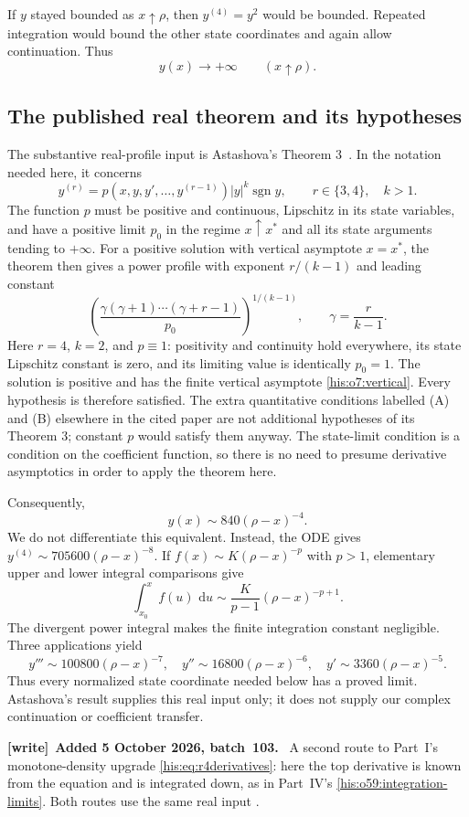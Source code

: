 \documentclass[11pt]{article}
\theoremstyle{remark}\newtheorem{remark}[theorem]{Remark}
\newcommand{\dd}{\,\mathrm d}
\numberwithin{equation}{section}
\newenvironment{writenote}[1][]{\par\smallskip\begingroup\small
 \noindent\textbf{[write]}\if\relax\detokenize{#1}\relax\else~\textbf{#1.}\fi\ }%
 {\par\endgroup\smallskip}
\begin{document}
If $y$ stayed bounded as $x\uparrow\rho$, then $y^{(4)}=y^2$
would be bounded. Repeated integration would bound the other state
coordinates and again allow continuation. Thus
\begin{equation}\label{his:o7:vertical}
y(x)\longrightarrow+\infty\qquad(x\uparrow\rho).
\end{equation}

\subsection{The published real theorem and its hypotheses}
The substantive real-profile input is Astashova's
Theorem 3~\cite[p.~5]{astashova2013}. In the notation needed here, it concerns
\[
y^{(r)}=p(x,y,y',\ldots,y^{(r-1)})|y|^k\operatorname{sgn}y,
\qquad r\in\{3,4\},\quad k>1.
\]
The function $p$ must be positive and continuous, Lipschitz in its
state variables, and have a positive limit $p_0$ in the regime
$x\uparrow x^*$ and all its state arguments tending to $+\infty$.
For a positive solution with vertical asymptote $x=x^*$, the theorem
then gives a power profile with exponent $r/(k-1)$ and leading
constant
\[
\left(\frac{\gamma(\gamma+1)\cdots(\gamma+r-1)}{p_0}
\right)^{1/(k-1)},\qquad \gamma=\frac{r}{k-1}.
\]
Here $r=4$, $k=2$, and $p\equiv1$: positivity and continuity hold
everywhere, its state Lipschitz constant is zero, and its limiting
value is identically $p_0=1$. The solution is positive and has the
finite vertical asymptote \eqref{his:o7:vertical}. Every hypothesis is
therefore satisfied. The extra quantitative conditions labelled
(A) and (B) elsewhere in the cited paper are not additional
hypotheses of its Theorem 3; constant $p$ would satisfy them anyway.
The state-limit condition is a condition on the coefficient function,
so there is no need to presume derivative asymptotics in order to
apply the theorem here.

Consequently,
\begin{equation}\label{his:o7:profile}
y(x)\sim840(\rho-x)^{-4}.
\end{equation}
We do not differentiate this equivalent. Instead, the ODE gives
$y^{(4)}\sim705600(\rho-x)^{-8}$.
If $f(x)\sim K(\rho-x)^{-p}$ with $p>1$, elementary upper and lower
integral comparisons give
\[
\int_{x_0}^x f(u)\,\dd u
\sim\frac{K}{p-1}(\rho-x)^{-p+1}.
\]
The divergent power integral makes the finite integration constant
negligible. Three applications yield
\begin{equation}\label{his:o7:derivatives}
y'''\sim100800(\rho-x)^{-7},\quad
 y''\sim16800(\rho-x)^{-6},\quad
 y'\sim3360(\rho-x)^{-5}.
\end{equation}
Thus every normalized state coordinate needed below has a proved
limit. Astashova's result supplies this real input only; it does not
supply our complex continuation or coefficient transfer.
\begin{writenote}[Added 5 October 2026, batch~103]
A second route to Part~I's monotone-density upgrade \eqref{his:eq:r4derivatives}: here the top derivative is known from the equation and is integrated down, as in Part~IV's \eqref{his:o59:integration-limits}. Both routes use the same real input \cite{astashova2013}.
\end{writenote}
\end{document}
